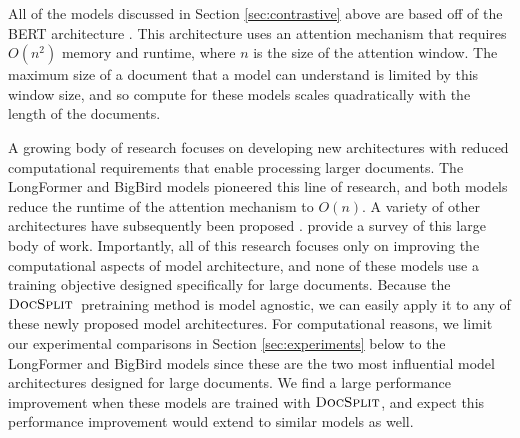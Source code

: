 \documentclass[11pt]{article}
\newcommand{\our}{\mbox{\textsc{DocSplit}}}
\newcommand{\ourlong}{$\our_{\mathrm{long}}$}
\begin{document}
All of the models discussed in Section \ref{sec:contrastive} above are based off of the BERT architecture \cite{Devlin2019BERTPO}.
This architecture uses an attention mechanism that requires $O(n^2)$ memory and runtime,
where $n$ is the size of the attention window.
The maximum size of a document that a model can understand is limited by this window size,
and so compute for these models scales quadratically with the length of the documents.

A growing body of research focuses on developing new architectures with reduced computational requirements that enable processing larger documents.
The LongFormer \cite{Beltagy2020LongformerTL} and BigBird \cite{Zaheer2020BigBT} models pioneered this line of research,
and both models reduce the runtime of the attention mechanism to $O(n)$.
A variety of other architectures have subsequently been proposed \cite[e.g.][]{zhou2021informer,fedus2022switch,choromanski2020rethinking,wang2020linformer,liu2022ecoformer}.
\citet{tay2022efficient} provide a survey of this large body of work.
Importantly, all of this research focuses only on improving the computational aspects of model architecture,
and none of these models use a training objective designed specifically for large documents.
Because the $\our$~pretraining method is model agnostic,
we can easily apply it to any of these newly proposed model architectures.
For computational reasons, we limit our experimental comparisons in Section \ref{sec:experiments} below to the LongFormer and BigBird models since these are the two most influential model architectures designed for large documents.
We find a large performance improvement when these models are trained with $\our$,
and expect this performance improvement would extend to similar models as well.

\end{document}
